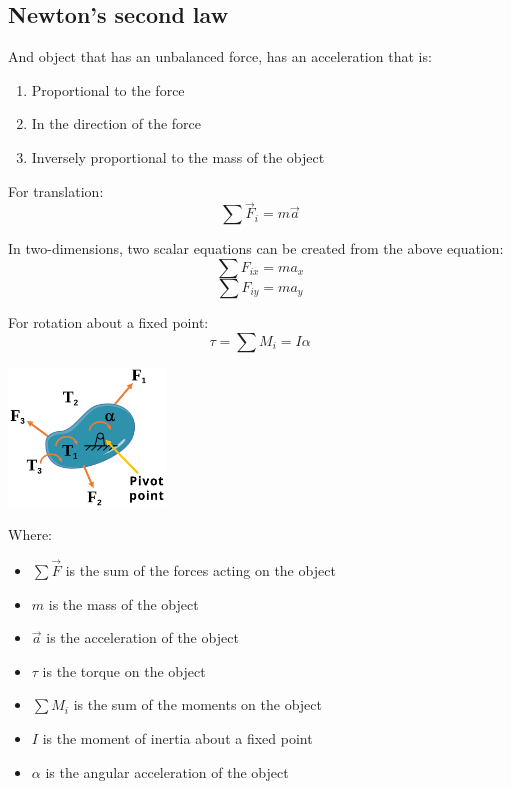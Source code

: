 \documentclass[11pt]{article}
\begin{document}
 \newpage
\subsection{Newton's second law}
\label{sec:org3003a66}
And object that has an unbalanced force, has an acceleration that is:
\begin{enumerate}
\item Proportional to the force
\item In the direction of the force
\item Inversely proportional to the mass of the object
\end{enumerate}

For translation:
\[\sum \vec{F}_i = m \vec{a}\]

In two-dimensions, two scalar equations can be created from the above equation:
\[\sum F_{ix} = m a_x\]
\[\sum F_{iy} = m a_y\]

For rotation about a fixed point:
\[\tau = \sum M_i = I \alpha\]

\begin{center}
\includegraphics[height=10em]{./images/rotation-about-a-fixed-point-diagram.png}
\end{center}

Where:
\begin{itemize}
\item \(\sum \vec{F}\) is the sum of the forces acting on the object
\item \(m\) is the mass of the object
\item \(\vec{a}\) is the acceleration of the object
\item \(\tau\) is the torque on the object
\item \(\sum M_i\) is the sum of the moments on the object
\item \(I\) is the moment of inertia about a fixed point
\item \(\alpha\) is the angular acceleration of the object
\end{itemize}

 \newpage
\end{document}
